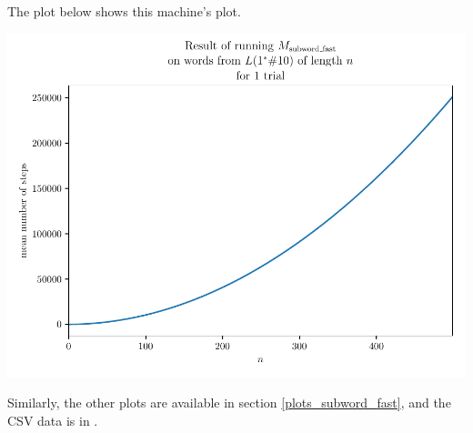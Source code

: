 The plot below shows this machine's plot. 
\begin{center}
    \includegraphics[width=\textwidth]{images/plots/subword_fast-ones.pdf}
\end{center}

Similarly, the other plots are available in section \ref{plots_subword_fast}, and the CSV data is in . 